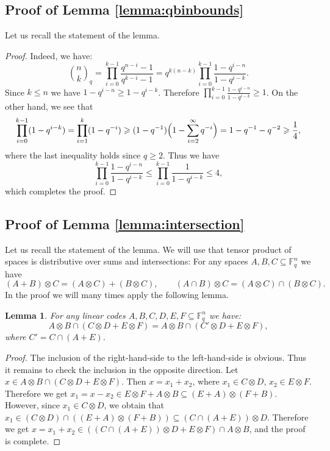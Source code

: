 \documentclass[11pt]{article}
\let\le\leqslant
\let\ge\geqslant
\theoremstyle{plain}
\newtheorem{lemma}{Lemma}
\theoremstyle{definition}
\theoremstyle{remark}
\newcommand{\F}{\mathbb{F}}
\newcommand{\qbin}[2]{\binom{#1}{#2}_{\! q}}
\begin{document}
\subsection{Proof of Lemma \ref{lemma:qbinbounds}}\label{sc:proof-qbinbounds}
Let us recall the statement of the lemma.
\QbinBounds*
\begin{proof} Indeed, we have:
$$
    \qbin{n}{k} = \prod_{i=0}^{k-1}\frac{q^{n-i}-1}{q^{k-i}-1} 
    = q^{k(n-k)}\prod_{i=0}^{k-1}\frac{1-q^{i-n}}{1-q^{i-k}}.
$$
Since $k\le n$ we have $1-q^{i-n}\ge 1-q^{i-k}$. Therefore $\prod_{i=0}^{k-1}\frac{1-q^{i-n}}{1-q^{i-k}}\ge 1$. On the other hand, we see that
$$ 
\prod_{i=0}^{k-1}(1-q^{i-k})=\prod_{i=1}^{k}(1-q^{-i})\ge (1-q^{-1})\Bigl(1-\sum_{i=2}^\infty q^{-i}\Bigr)=1-q^{-1}-q^{-2}\ge \frac{1}{4},
$$
where the last inequality holds since $q\ge 2$. Thus we have
$$\prod_{i=0}^{k-1}\frac{1-q^{i-n}}{1-q^{i-k}}\le \prod_{i=0}^{k-1}\frac{1}{1-q^{i-k}}\le 4,$$
which completes the proof.
\end{proof}

\subsection{Proof of Lemma \ref{lemma:intersection}}\label{sc:proof-intersection}
Let us recall the statement of the lemma.
\LemIntersection*
We will use that tensor product of spaces is distributive over sums and intersections: For any spaces $A,B,C\subseteq\F_q^n$ we have
\[
(A+B)\otimes C=(A\otimes C)+(B\otimes C),\qquad (A\cap B)\otimes C=(A\otimes C)\cap (B\otimes C).
\]
In the proof we will many times apply the following lemma.
\begin{lemma}\label{lemma:linsp-eq}
    For any linear codes $A,B,C,D,E,F\subseteq \F_q^n$ we have: 
    $$A\otimes B\cap (C\otimes D+E\otimes F)=A\otimes B\cap (C'\otimes D+E\otimes F),
    $$
    where $C' = C\cap(A+E)$.
\end{lemma}
\begin{proof}
    The inclusion of the right-hand-side to the left-hand-side is obvious. Thus it remains to check the inclusion in the opposite direction. 
    Let $x\in A\otimes B\cap (C\otimes D+E\otimes F)$. Then $x=x_1+x_2$, where $x_1\in C\otimes D$, $x_2\in E\otimes F$. Therefore we get $x_1=x-x_2\in E\otimes F+A\otimes B\subseteq (E+A)\otimes (F+B)$. However, since $x_1\in C\otimes D$, we obtain that $x_1\in (C\otimes D)\cap ((E+A)\otimes (F+B))\subseteq (C\cap (A+E))\otimes D$. Therefore we get
    $x=x_1+x_2\in ((C\cap (A+E))\otimes D+E\otimes F)\cap A\otimes B$, and the proof is complete.
\end{proof}
\end{document}
